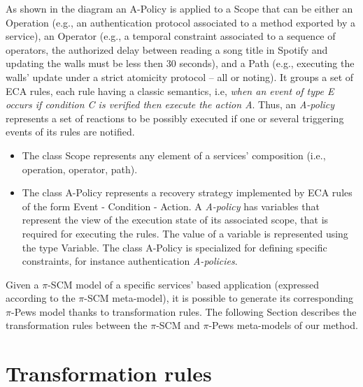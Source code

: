 As shown in the diagram an {\sc A-Policy} is applied to a {\sc Scope} that can be either an {\sc Operation} (e.g., an authentication protocol associated to a method exported by a service),  an {\sc Operator} (e.g., a temporal constraint associated to a sequence of operators, the authorized delay between reading a song title in Spotify and updating the walls must be less then 30 seconds), and a {\sc Path} (e.g., executing the walls' update under a strict atomicity protocol -- all or noting).  It groups a set of ECA rules, each rule having a classic semantics, i.e, {\em when an event of type E occurs if  condition C is verified then execute the action A}.  Thus, an {\em A-policy} represents a set of reactions to be possibly executed if one or several triggering events of its rules are notified.
\begin{itemize}
\item The class {\sc Scope} represents any element of a services' composition (i.e., operation, operator, path).
\item The class {\sc A-Policy} represents a recovery strategy implemented by ECA rules of the form {\sc Event} - {\sc Condition} - {\sc Action}. A {\em A-policy} has variables that represent the view of the execution state of its associated scope, that is required for executing the rules. The value of a variable is represented using the type {\sc Variable}. The class {\sc A-Policy} is specialized for defining specific constraints, for instance authentication {\em A-policies}.
\end{itemize}

%

Given a $\pi$-SCM model of a specific services' based application (expressed according to the $\pi$-SCM meta-model), it is possible to generate its corresponding $\pi$-{\sc Pews} model thanks to transformation rules. The following Section describes the transformation rules between the $\pi$-SCM and $\pi$-{\sc Pews} meta-models of our method.

\section{Transformation rules}\label{sec:mmrules}

